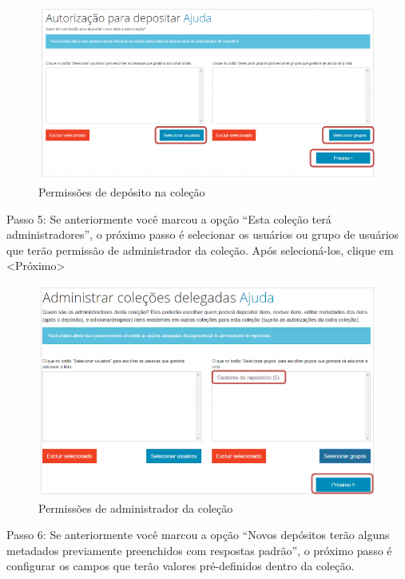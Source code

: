 \documentclass[12pt,hidelinks]{article}
\begin{document}
    \begin{figure}[!htp]
                \centering
                \includegraphics[scale=0.8]{figura/Figura36.png}
                \caption{Permissões de depósito na coleção}
            \label{Rotulo}
        \end{figure}

\newpage

    Passo 5: Se anteriormente você marcou a opção “Esta coleção terá administradores”, o próximo passo é selecionar os usuários ou grupo de usuários que terão permissão de administrador da coleção. Após selecioná-los, clique em <Próximo>
    
    \begin{figure}[!htp]
                \centering
                \includegraphics[scale=0.7]{figura/Figura37.png}
                \caption{Permissões de administrador da coleção}
            \label{Rotulo}
        \end{figure}
    
    Passo 6: Se anteriormente você marcou a opção “Novos depósitos terão alguns metadados previamente preenchidos com respostas padrão”, o próximo passo é configurar os campos que terão valores pré-definidos dentro da coleção.
    
\end{document}

